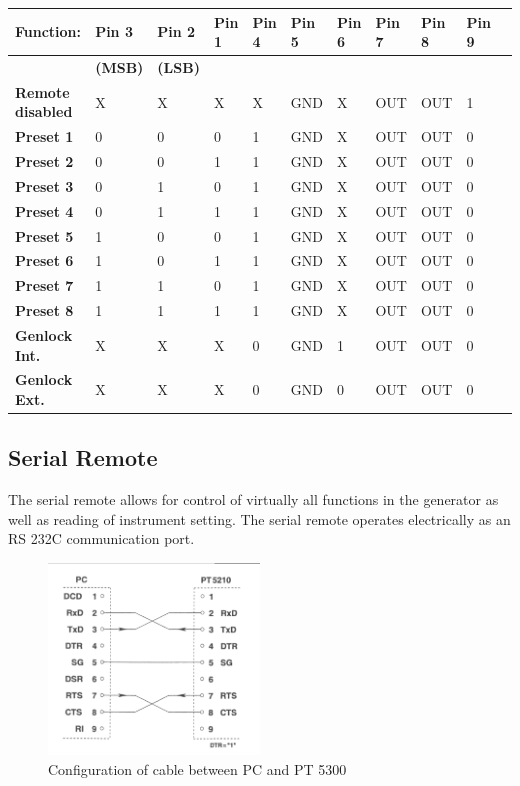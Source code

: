 {\tiny
\begin{tabular}{|l|l|l|l|l|l|l|l|l|l|l|}
\hline
\textbf{Function:}		& \textbf{Pin 3} & \textbf{Pin 2} & \textbf{Pin 1} & \textbf{Pin 4} & \textbf{Pin 5} & \textbf{Pin 6} & \textbf{Pin 7} & \textbf{Pin 8} & \textbf{Pin 9} \\ \hline
 & \textbf{(MSB)} & \textbf{(LSB)} & & & & & & & \\ \hline
\textbf{Remote disabled} 	& X & X & X & X & GND & X & OUT & OUT & 1 \\ \hline
\textbf{Preset 1}					& 0 & 0 & 0 & 1 & GND & X & OUT & OUT & 0 \\ \hline
\textbf{Preset 2} 				& 0 & 0 & 1 & 1 & GND & X & OUT & OUT & 0 \\ \hline
\textbf{Preset 3}					& 0 & 1 & 0 & 1 & GND & X & OUT & OUT & 0 \\ \hline
\textbf{Preset 4}					& 0 & 1 & 1 & 1 & GND & X & OUT & OUT & 0 \\ \hline
\textbf{Preset 5}					& 1 & 0 & 0 & 1 & GND & X & OUT & OUT & 0 \\ \hline
\textbf{Preset 6}					& 1 & 0 & 1 & 1 & GND & X & OUT & OUT & 0 \\ \hline
\textbf{Preset 7}					& 1 & 1 & 0 & 1 & GND & X & OUT & OUT & 0 \\ \hline
\textbf{Preset 8}					& 1 & 1 & 1 & 1 & GND & X & OUT & OUT & 0 \\ \hline
\textbf{Genlock Int.}	& X & X & X & 0 & GND & 1 & OUT & OUT & 0 \\ \hline
\textbf{Genlock Ext.}	& X & X & X & 0 & GND & 0 & OUT & OUT & 0 \\ \hline
\end{tabular}
}

\subsection{Serial Remote}

The serial remote allows for control of virtually all functions in the generator as well as reading of instrument setting.
The serial remote operates electrically as an RS 232C communication port. %

\begin{figure}[hbt]
\centering
\includegraphics[width=0.5\textwidth]{fig/RS232_connection}
\caption{Configuration of cable between PC and PT 5300}
\end{figure}

